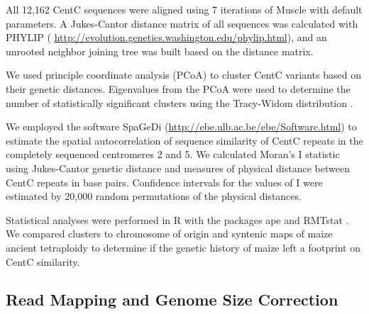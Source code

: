 All 12,162 CentC sequences were aligned using 7 iterations of Muscle \citep{Edgar2004} with default parameters.
A Jukes-Cantor distance matrix of all sequences was calculated with PHYLIP (\citep{Felsenstein1989} \url{http://evolution.genetics.washington.edu/phylip.html}), and an unrooted neighbor joining tree was built based on the distance matrix.  
	
We used principle coordinate analysis (PCoA) to cluster CentC variants based on their genetic distances. 
Eigenvalues from the PCoA were used to determine the number of statistically significant clusters using the Tracy-Widom distribution \citep{Patterson2006}.  
	
We employed the software SpaGeDi (\citep{Hardy2002}\url{http://ebe.ulb.ac.be/ebe/Software.html}) to estimate the spatial autocorrelation of sequence similarity of CentC repeats in the completely sequenced centromeres 2 and 5.  We calculated Moran’s I statistic using Jukes-Cantor genetic distance and measures of physical distance between CentC repeats in base pairs.  Confidence intervals for the values of I were estimated by 20,000 random permutations of the physical distances.  
	
Statistical analyses were performed in R with the packages ape \citep{Paradis2004} and RMTstat \citep{Perry2009}.  We compared clusters to chromosome of origin and syntenic maps of maize ancient tetraploidy \citep{Schnable2011} to determine if the genetic history of maize left a footprint on CentC similarity.

\subsection*{Read Mapping and Genome Size Correction}
	
